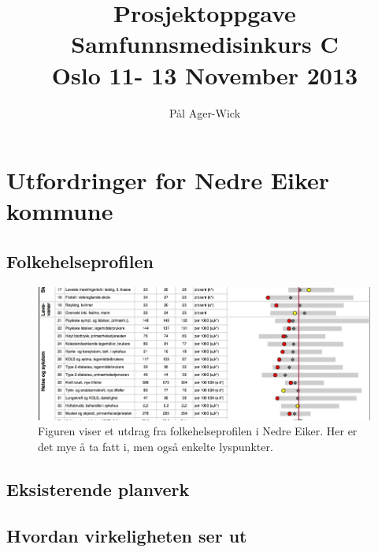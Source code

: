 \documentclass[11pt]{memoir} %
\title{Prosjektoppgave \\ Samfunnsmedisinkurs C \\ Oslo 11- 13 November 2013}
\author{Pål Ager-Wick}
\date{} %
\begin{document}
			\renewcommand{\chaptername}{Del}
            \renewcommand{\contentsname}{Innhold}
            \renewcommand\listfigurename{Illustrasjoner}
            \renewcommand\tablename{Tabell}
			\renewcommand\listtablename{Tabeller}
            \renewcommand{\figurename}{Illustrasjon}

\maketitle


\chapter{Utfordringer for Nedre Eiker kommune}
	\section{Folkehelseprofilen}


                    \begin{figure}[ht]
                      \centering
                      \includegraphics{./fhprofilnek.jpg}%
                      \caption[Utdrag fra folkehelseprofilen i Nedre Eiker]%
                      {Figuren viser et utdrag fra folkehelseprofilen i Nedre Eiker. Her er det mye å ta fatt i, men også enkelte lyspunkter.\cite{fhprofil}}
                    \end{figure}    


	\section{Eksisterende planverk}
	\section{Hvordan virkeligheten ser ut}
\end{document}
